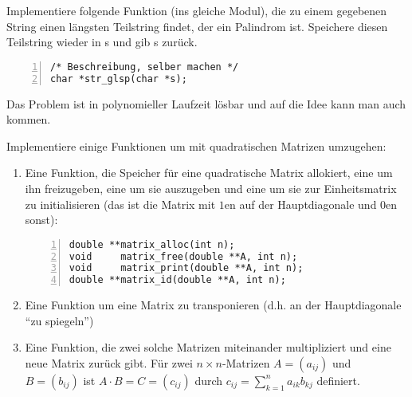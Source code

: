 \documentclass{uebungszettel}
\begin{document}
\begin{aufg}
Implementiere folgende Funktion (ins gleiche Modul), die zu einem gegebenen String einen längsten Teilstring findet, der ein Palindrom ist. Speichere diesen Teilstring wieder in s und gib s zurück.
\begin{codelisting}
\begin{lstlisting}[numbers=left,numberstyle=\tiny,frame=tlrb]
/* Beschreibung, selber machen */
char *str_glsp(char *s);
\end{lstlisting}
\end{codelisting}
Das Problem ist in polynomieller Laufzeit lösbar und auf die Idee kann man auch kommen. 
\end{aufg}

\begin{aufg} Implementiere einige Funktionen um mit quadratischen Matrizen umzugehen:
\begin{enumerate}
\item Eine Funktion, die Speicher für eine quadratische Matrix allokiert, eine um ihn freizugeben, eine um sie auszugeben und eine um sie zur Einheitsmatrix zu initialisieren (das ist die Matrix mit $1$en auf der Hauptdiagonale und $0$en sonst):
\begin{codelisting}
\begin{lstlisting}[numbers=left,numberstyle=\tiny,frame=tlrb]
double **matrix_alloc(int n);
void     matrix_free(double **A, int n);
void     matrix_print(double **A, int n);
double **matrix_id(double **A, int n);
\end{lstlisting}
\end{codelisting}
\item Eine Funktion um eine Matrix zu transponieren (d.h. an der Hauptdiagonale ``zu spiegeln'')
\item Eine Funktion, die zwei solche Matrizen miteinander multipliziert und eine neue Matrix zurück gibt. Für zwei $n \times n$-Matrizen $A = (a_{ij})$ und $B = (b_{ij})$ ist $A \cdot B = C = (c_{ij})$ durch $c_{ij} = \sum_{k=1}^n a_{ik} b_{kj}$ definiert.
\end{enumerate}
\end{aufg}
\end{document}
